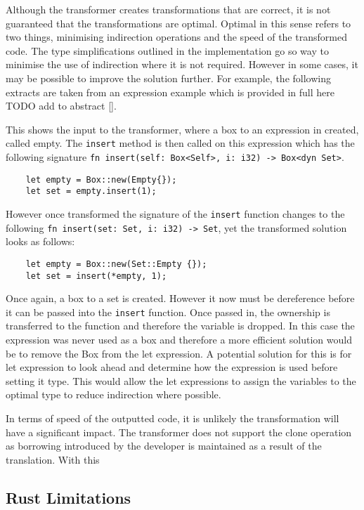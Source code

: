 \documentclass[ oneside,%
                    author={James Elgar},
                    degree={MEng},
                     title={Bidirectional transformer between functional and \\ object-oriented programming in Rust},
                  subtitle={}]{dissertation}
\newcommand{\rust}[1]{\texttt{#1}}
\begin{document}
Although the transformer creates transformations that are correct, it is not guaranteed that the transformations are optimal. Optimal in this sense refers to two things, minimising indirection operations and the speed of the transformed code. The type simplifications outlined in the implementation go so way to minimise the use of indirection where it is not required. However in some cases, it may be possible to improve the solution further. For example, the following extracts are taken from an expression example which is provided in full here TODO add to abstract \autoref{}. 

\sloppy This shows the input to the transformer, where a box to an expression in created, called empty. The \rust{insert} method is then called on this expression which has the following signature \rust{fn insert(self: Box<Self>, i: i32) -> Box<dyn Set>}.
\begin{verbatim}
    let empty = Box::new(Empty{});
    let set = empty.insert(1);
\end{verbatim}

\sloppy However once transformed the signature of the \rust{insert} function changes to the following \rust{fn insert(set: Set, i: i32) -> Set}, yet the transformed solution looks as follows:

\begin{verbatim}
    let empty = Box::new(Set::Empty {});
    let set = insert(*empty, 1);
\end{verbatim}

Once again, a box to a set is created. However it now must be dereference before it can be passed into the \rust{insert} function. Once passed in, the ownership is transferred to the function and therefore the variable is dropped. In this case the expression was never used as a box and therefore a more efficient solution would be to remove the Box from the let expression. A potential solution for this is for let expression to look ahead and determine how the expression is used before setting it type. This would allow the let expressions to assign the variables to the optimal type to reduce indirection where possible. 

In terms of speed of the outputted code, it is unlikely the transformation will have a significant impact. The transformer does not support the clone operation as borrowing introduced by the developer is maintained as a result of the translation. With this 



\subsection{Rust Limitations}
\end{document}
